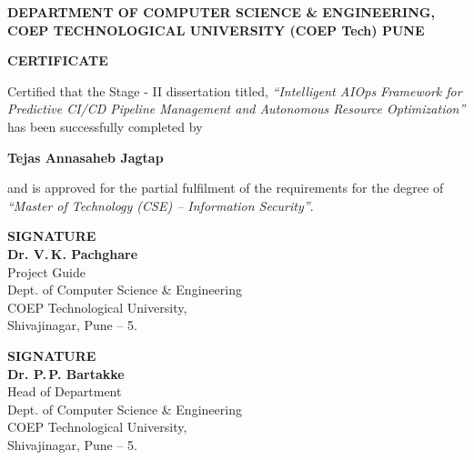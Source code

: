 \documentclass[12pt]{report}
\begin{document}
\begin{titlepage}
\thispagestyle{empty}

\linespread{1.3}
\begin{center}
    \Large{\bf{DEPARTMENT OF COMPUTER SCIENCE \& ENGINEERING,\\ 
	       COEP TECHNOLOGICAL UNIVERSITY (COEP Tech) PUNE\\}}
\end{center}

\vspace{1.2cm}

\begin{center}
    {\Large\bfseries CERTIFICATE}
\end{center}

\vspace{1.2cm}

\noindent
\large
Certified that the Stage - II dissertation titled,
\textit{``Intelligent AIOps Framework for Predictive CI/CD
Pipeline Management and Autonomous Resource
Optimization''}
has been successfully completed by

\vspace{0.8cm}

\begin{center}
    {\Large\bfseries Tejas Annasaheb Jagtap }
\end{center}

\vspace{0.8cm}

\noindent
and is approved for the partial fulfilment of the requirements for the degree of  
\textit{``Master of Technology (CSE) -- Information Security''}.

\vspace{2.2cm}

\begin{minipage}{0.45\textwidth}
    \textbf{SIGNATURE} \\[0.7em]
    \textbf{Dr. V.\,K. Pachghare} \\
    Project Guide \\[0.3em]
    Dept. of Computer Science \& Engineering \\[0.3em]
    COEP Technological University,\\
    Shivajinagar, Pune -- 5.
\end{minipage}
\hfill
\begin{minipage}{0.45\textwidth}
    \textbf{SIGNATURE} \\[0.7em]
    \textbf{Dr. P.\,P. Bartakke} \\
    Head of Department \\[0.3em]
    Dept. of Computer Science \& Engineering \\[0.3em]
    COEP Technological University,\\
    Shivajinagar, Pune -- 5.
\end{minipage}

\end{titlepage}
\end{document}
